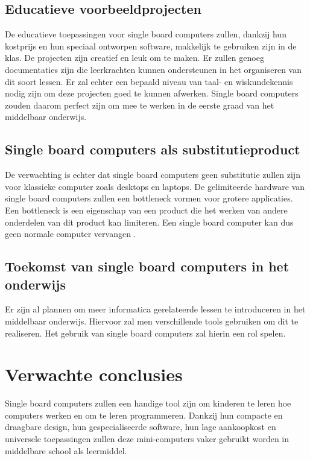 \subsection{Educatieve voorbeeldprojecten}
De educatieve toepassingen voor single board computers zullen, dankzij hun kostprijs en hun speciaal ontworpen software, makkelijk te gebruiken zijn in de klas. De projecten zijn creatief en leuk om te maken. Er zullen genoeg documentaties zijn die leerkrachten kunnen ondersteunen in het organiseren van dit soort lessen. Er zal echter een bepaald niveau van taal- en wiskundekennis nodig zijn om deze projecten goed te kunnen afwerken. Single board computers zouden daarom perfect zijn om mee te werken in de eerste graad van het middelbaar onderwijs.

\subsection{Single board computers als substitutieproduct}
De verwachting is echter dat single board computers geen substitutie zullen zijn voor klassieke computer zoals desktops en laptops. De gelimiteerde hardware van single board computers zullen een bottleneck vormen voor grotere applicaties. Een bottleneck is een eigenschap van een product die het werken van andere onderdelen van dit product kan limiteren. Een single board computer kan dus geen normale computer vervangen \autocite{Kuss2018}.

\subsection{Toekomst van single board computers in het onderwijs}
Er zijn al plannen om meer informatica gerelateerde lessen te introduceren in het middelbaar onderwijs. Hiervoor zal men verschillende tools gebruiken om dit te realiseren. Het gebruik van single board computers zal hierin een rol spelen. 
\section{Verwachte conclusies}
\label{sec:verwachte_conclusies}

Single board computers zullen een handige tool zijn om kinderen te leren hoe computers werken en om te leren programmeren. Dankzij hun compacte en draagbare design, hun gespecialiseerde software, hun lage aankoopkost en universele toepassingen zullen deze mini-computers vaker gebruikt worden in middelbare school als leermiddel.

